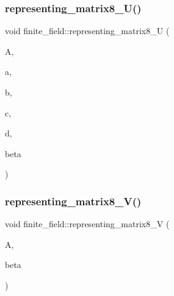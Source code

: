 \mbox{\label{classfinite__field_acb5a5551f5c68aeba2b726937a4ee8be}} 
\subsubsection{\texorpdfstring{representing\+\_\+matrix8\+\_\+\+U()}{representing\_matrix8\_U()}}
{\footnotesize\ttfamily void finite\+\_\+field\+::representing\+\_\+matrix8\+\_\+U (\begin{DoxyParamCaption}\item[{\mbox{\hyperlink{galois_8h_a09fddde158a3a20bd2dcadb609de11dc}{I\+NT}} $\ast$}]{A,  }\item[{\mbox{\hyperlink{galois_8h_a09fddde158a3a20bd2dcadb609de11dc}{I\+NT}}}]{a,  }\item[{\mbox{\hyperlink{galois_8h_a09fddde158a3a20bd2dcadb609de11dc}{I\+NT}}}]{b,  }\item[{\mbox{\hyperlink{galois_8h_a09fddde158a3a20bd2dcadb609de11dc}{I\+NT}}}]{c,  }\item[{\mbox{\hyperlink{galois_8h_a09fddde158a3a20bd2dcadb609de11dc}{I\+NT}}}]{d,  }\item[{\mbox{\hyperlink{galois_8h_a09fddde158a3a20bd2dcadb609de11dc}{I\+NT}}}]{beta }\end{DoxyParamCaption})}

\mbox{\label{classfinite__field_afbf566e5a8e3983ed5e3589f695e7c4a}} 
\subsubsection{\texorpdfstring{representing\+\_\+matrix8\+\_\+\+V()}{representing\_matrix8\_V()}}
{\footnotesize\ttfamily void finite\+\_\+field\+::representing\+\_\+matrix8\+\_\+V (\begin{DoxyParamCaption}\item[{\mbox{\hyperlink{galois_8h_a09fddde158a3a20bd2dcadb609de11dc}{I\+NT}} $\ast$}]{A,  }\item[{\mbox{\hyperlink{galois_8h_a09fddde158a3a20bd2dcadb609de11dc}{I\+NT}}}]{beta }\end{DoxyParamCaption})}

